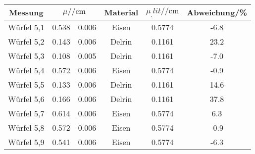 \label{tab:tabWürfel51-9}
	\begin{tabular}{cS[table-format=1.3]@{${}\pm{}$}S[table-format=1.3]cS[table-format=1.4]S[table-format=2.1]}
		\toprule
		{Messung} &  & {Material} & {$\mu_.{lit}/\si{\per\centi\metre}$} & {Abweichung/\si{\%}}\\
		\midrule
		 {Würfel 5,1}   & 0.538 & 0.006 & {Eisen} 	& 0.5774	&  -6.8\\
		 {Würfel 5,2} 	& 0.143 & 0.006 & {Delrin} 	& 0.1161  	&  23.2\\
		 {Würfel 5,3} 	& 0.108 & 0.005 & {Delrin} 	& 0.1161  	&  -7.0\\
		 {Würfel 5,4} 	& 0.572 & 0.006 & {Eisen} 	& 0.5774  	&  -0.9\\
		 {Würfel 5,5} 	& 0.133 & 0.006 & {Delrin} 	& 0.1161  	&  14.6\\
		 {Würfel 5,6} 	& 0.166 & 0.006 & {Delrin} 	& 0.1161  	&  37.8\\
		 {Würfel 5,7} 	& 0.614 & 0.006 & {Eisen} 	& 0.5774  	&  6.3\\
		 {Würfel 5,8} 	& 0.572 & 0.006 & {Eisen} 	& 0.5774  	&  -0.9\\
		 {Würfel 5,9} 	& 0.541 & 0.006 & {Eisen} 	& 0.5774  	&  -6.3\\
		\bottomrule
	\end{tabular}
